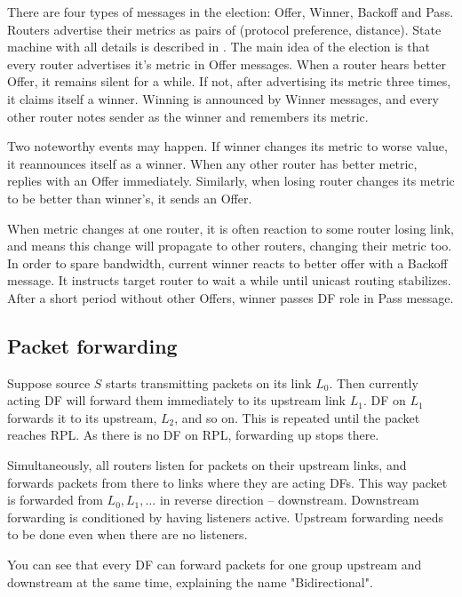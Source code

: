 There are four types of messages in the election: Offer, Winner, Backoff and
Pass. Routers advertise their metrics as pairs of (protocol preference, distance).
State machine with all details is described in . The main idea of the
election is that every router advertises it's metric in Offer messages. When
a router hears better Offer, it remains silent for a while. If not, after
advertising its metric three times, it claims itself a winner. Winning is
announced by Winner messages, and every other router notes sender as the
winner and remembers its metric.

Two noteworthy events may happen. If winner changes its metric to worse value,
it reannounces itself as a winner. When any other router has better metric,
replies with an Offer immediately. Similarly, when losing router changes its
metric to be better than winner's, it sends an Offer.

When metric changes at one router, it is often reaction to some router losing
link, and means this change will propagate to other routers, changing their
metric too. In order to spare bandwidth, current winner reacts to better offer
with a Backoff message. It instructs target router to wait a while until
unicast routing stabilizes. After a short period without other Offers, winner
passes DF role in Pass message.


\subsection{Packet forwarding}

Suppose source $S$ starts transmitting packets on its link $L_0$. Then
currently acting DF will forward them immediately to its upstream link $L_1$.
DF on $L_1$ forwards it to its upstream, $L_2$, and so on. This is repeated
until the packet reaches RPL. As there is no DF on RPL, forwarding up stops
there.

Simultaneously, all routers listen for packets on their upstream links, and
forwards packets from there to links where they are acting DFs. This way packet
is forwarded from $L_0, L_1, \dots$ in reverse direction -- downstream.
Downstream forwarding is conditioned by having listeners active. Upstream
forwarding needs to be done even when there are no listeners.

You can see that every DF can forward packets for one group upstream and
downstream at the same time, explaining the name "Bidirectional".

